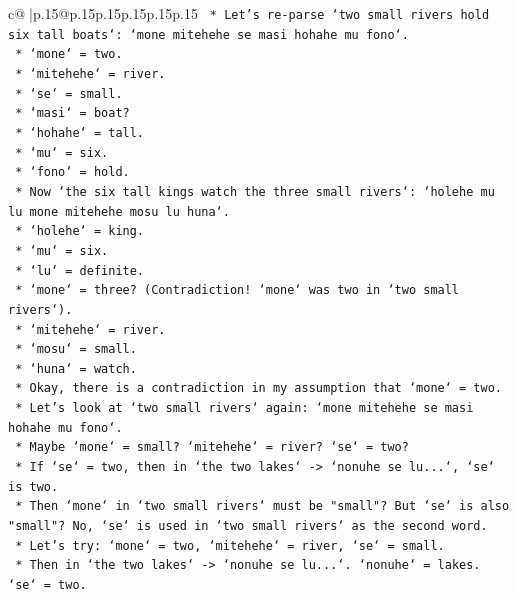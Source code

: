 \documentclass{article}
\begin{document}
{\begin{supertabular}{c@{$\;$}|p{.15\linewidth}@{}p{.15\linewidth}p{.15\linewidth}p{.15\linewidth}p{.15\linewidth}p{.15\linewidth}}
{{{\texttt{                *   Let's re{-}parse `two small rivers hold six tall boats`: `mone mitehehe se masi hohahe mu fono`.} \\
\texttt{                    *   `mone` = two.} \\
\texttt{                    *   `mitehehe` = river.} \\
\texttt{                    *   `se` = small.} \\
\texttt{                    *   `masi` = boat?} \\
\texttt{                    *   `hohahe` = tall.} \\
\texttt{                    *   `mu` = six.} \\
\texttt{                    *   `fono` = hold.} \\
\texttt{                *   Now `the six tall kings watch the three small rivers`: `holehe mu lu mone mitehehe mosu lu huna`.} \\
\texttt{                    *   `holehe` = king.} \\
\texttt{                    *   `mu` = six.} \\
\texttt{                    *   `lu` = definite.} \\
\texttt{                    *   `mone` = three? (Contradiction! `mone` was two in `two small rivers`).} \\
\texttt{                    *   `mitehehe` = river.} \\
\texttt{                    *   `mosu` = small.} \\
\texttt{                    *   `huna` = watch.} \\
\texttt{                *   Okay, there is a contradiction in my assumption that `mone` = two.} \\
\texttt{                *   Let's look at `two small rivers` again: `mone mitehehe se masi hohahe mu fono`.} \\
\texttt{                    *   Maybe `mone` = small? `mitehehe` = river? `se` = two?} \\
\texttt{                    *   If `se` = two, then in `the two lakes` {-}> `nonuhe se lu...`, `se` is two.} \\
\texttt{                    *   Then `mone` in `two small rivers` must be "small"? But `se` is also "small"? No, `se` is used in `two small rivers` as the second word.} \\
\texttt{                    *   Let's try: `mone` = two, `mitehehe` = river, `se` = small.} \\
\texttt{                    *   Then in `the two lakes` {-}> `nonuhe se lu...`. `nonuhe` = lakes. `se` = two.} \\
}}}
\end{supertabular}}
\end{document}
